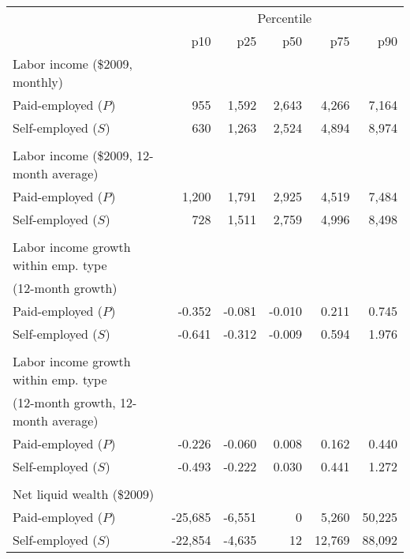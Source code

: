 \begin{tabular}{lrrrrr}
\toprule
      & \multicolumn{5}{c}{Percentile} \\
\cmidrule{2-6}      & p10   & p25   & p50   & p75   & p90 \\
\midrule
Labor income (\$2009, monthly) &       &       &       &       &  \\
\quad Paid-employed ($P$) &                      955  &                     1,592  &                     2,643  &                        4,266  &                       7,164  \\
\quad Self-employed ($S$) &                      630  &                     1,263  &                     2,524  &                        4,894  &                       8,974  \\
      &       &       &       &       &  \\
Labor income (\$2009,  12-month average) &       &       &       &       &  \\
\quad Paid-employed ($P$) &                   1,200  &                     1,791  &                     2,925  &                        4,519  &                       7,484  \\
\quad Self-employed ($S$) &                      728  &                     1,511  &                     2,759  &                        4,996  &                       8,498  \\
      &       &       &       &       &  \\
Labor income growth within emp. type  &       &       &       &       &  \\
(12-month growth) &       &       &       &       &  \\
\quad Paid-employed ($P$) & -0.352 & -0.081 & -0.010 & 0.211 & 0.745 \\
\quad Self-employed ($S$) & -0.641 & -0.312 & -0.009 & 0.594 & 1.976 \\
      &       &       &       &       &  \\
Labor income growth within emp. type  &       &       &       &       &  \\
(12-month growth, 12-month average) &       &       &       &       &  \\
\quad Paid-employed ($P$) & -0.226 & -0.060 & 0.008 & 0.162 & 0.440 \\
\quad Self-employed ($S$) & -0.493 & -0.222 & 0.030 & 0.441 & 1.272 \\
      &       &       &       &       &  \\
Net liquid wealth (\$2009) &       &       &       &       &  \\
\quad Paid-employed ($P$) & -25,685 & -6,551 & 0     & 5,260 & 50,225 \\
\quad Self-employed ($S$) & -22,854 & -4,635 & 12    & 12,769 & 88,092 \\
\bottomrule
\end{tabular}%

